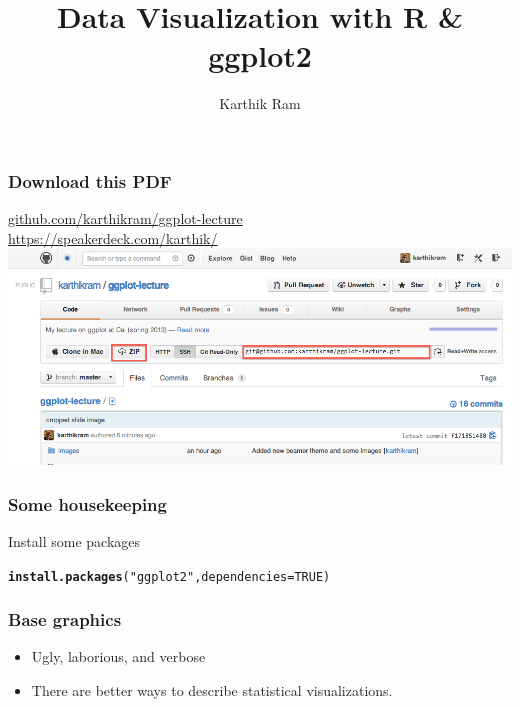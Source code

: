 \documentclass{beamer}\usepackage{graphicx, color}
\makeatletter
\newcommand{\hlfunctioncall}[1]{\textcolor[rgb]{0.501960784313725,0,0.329411764705882}{\textbf{#1}}}%
\newcommand{\hlstring}[1]{\textcolor[rgb]{0.6,0.6,1}{#1}}%
\newenvironment{kframe}{%
 \def\at@end@of@kframe{}%
 \ifinner\ifhmode%
  \def\at@end@of@kframe{\end{minipage}}%
  \begin{minipage}{\columnwidth}%
 \fi\fi%
 \def\FrameCommand##1{\hskip\@totalleftmargin \hskip-\fboxsep
 \colorbox{shadecolor}{##1}\hskip-\fboxsep
     \hskip-\linewidth \hskip-\@totalleftmargin \hskip\columnwidth}%
 \MakeFramed {\advance\hsize-\width
   \@totalleftmargin\z@ \linewidth\hsize
   \@setminipage}}%
 {\par\unskip\endMakeFramed%
 \at@end@of@kframe}
\newenvironment{knitrout}{}{} %
\makeatother
\begin{document}
\title{Data Visualization with R \& ggplot2}
\author{Karthik Ram}
\maketitle

\begin{frame}[fragile]
\frametitle{Download this PDF}
\begingroup
    \fontsize{12pt}{12pt}\selectfont
\href{http://github.com/karthikram/ggplot-lecture}{github.com/karthikram/ggplot-lecture}\\
\href{https://speakerdeck.com/karthik/}{https://speakerdeck.com/karthik/}
\endgroup
\includegraphics[scale=.31]{images/git_repo.png}
\end{frame}

\begin{frame}[fragile]
\frametitle{Some housekeeping}
Install some packages
\begin{knitrout}\footnotesize
{}\color{fgcolor}\begin{kframe}
\begin{alltt}
\hlfunctioncall{install.packages}(\hlstring{"ggplot2"}, dependencies = TRUE)
\end{alltt}
\end{kframe}
\end{knitrout}

\end{frame}



\begin{frame}[fragile]
\frametitle{Base graphics}
\begin{itemize}
\item Ugly, laborious, and verbose\\
\item There are better ways to describe statistical visualizations.\\
\end{itemize}
\end{frame}
\end{document}
